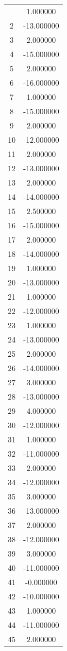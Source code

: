 \documentclass[12pt]{article}
\begin{document}
\begin{longtable}{@{}cc@{}}
\bottomrule
\endlastfoot
1 & 1.000000 \\
2 & -13.000000 \\
3 & 2.000000 \\
4 & -15.000000 \\
5 & 2.000000 \\
6 & -16.000000 \\
7 & 1.000000 \\
8 & -15.000000 \\
9 & 2.000000 \\
10 & -12.000000 \\
11 & 2.000000 \\
12 & -13.000000 \\
13 & 2.000000 \\
14 & -14.000000 \\
15 & 2.500000 \\
16 & -15.000000 \\
17 & 2.000000 \\
18 & -14.000000 \\
19 & 1.000000 \\
20 & -13.000000 \\
21 & 1.000000 \\
22 & -12.000000 \\
23 & 1.000000 \\
24 & -13.000000 \\
25 & 2.000000 \\
26 & -14.000000 \\
27 & 3.000000 \\
28 & -13.000000 \\
29 & 4.000000 \\
30 & -12.000000 \\
31 & 1.000000 \\
32 & -11.000000 \\
33 & 2.000000 \\
34 & -12.000000 \\
35 & 3.000000 \\
36 & -13.000000 \\
37 & 2.000000 \\
38 & -12.000000 \\
39 & 3.000000 \\
40 & -11.000000 \\
41 & -0.000000 \\
42 & -10.000000 \\
43 & 1.000000 \\
44 & -11.000000 \\
45 & 2.000000 \\

\end{longtable}
\end{document}
